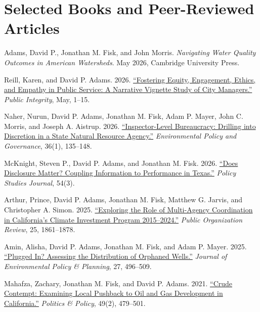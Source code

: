 \documentclass[12pt,letterpaper]{article}
\renewenvironment{itemize}{
  \begin{list}{}{
    \setlength{\leftmargin}{1.5em}
    \setlength{\itemsep}{0pt}\setlength{\topsep}{0pt}
    \setlength{\parskip}{0pt}
    \setlength{\parsep}{0.08em}
  }
}{
  \end{list}
}
\begin{document}
\section*{Selected Books and Peer-Reviewed Articles}
\begin{itemize}\leftmargin=2pt\itemindent=-15pt
  \item Adams, David P., Jonathan M. Fisk, and John Morris. \emph{Navigating Water Quality Outcomes in American Watersheds}. May 2026, Cambridge University Press.
  \item Reill, Karen, and David P. Adams. 2026. \href{https://doi.org/10.1080/10999922.2026.2665006}{``Fostering Equity, Engagement, Ethics, and Empathy in Public Service: A Narrative Vignette Study of City Managers.''} \emph{Public Integrity}, May, 1--15.
  \item Naher, Nurun, David P. Adams, Jonathan M. Fisk, Adam P. Mayer, John C. Morris, and Joseph A. Aistrup. 2026. \href{https://doi.org/10.1002/eet.70038}{``Inspector-Level Bureaucracy: Drilling into Discretion in a State Natural Resource Agency.''} \emph{Environmental Policy and Governance}, 36(1), 135--148.
  \item McKnight, Steven P., David P. Adams, and Jonathan M. Fisk. 2026. \href{https://doi.org/10.1111/psj.70064}{``Does Disclosure Matter? Coupling Information to Performance in Texas.''} \emph{Policy Studies Journal}, 54(3).
  \item Arthur, Prince, David P. Adams, Jonathan M. Fisk, Matthew G. Jarvis, and Christopher A. Simon. 2025. \href{https://doi.org/10.1007/s11115-025-00958-2}{``Exploring the Role of Multi-Agency Coordination in California's Climate Investment Program 2015--2024.''} \emph{Public Organization Review}, 25, 1861--1878.
  \item Amin, Alisha, David P. Adams, Jonathan M. Fisk, and Adam P. Mayer. 2025. \href{https://doi.org/10.1080/1523908X.2025.2480289}{``Plugged In? Assessing the Distribution of Orphaned Wells.''} \emph{Journal of Environmental Policy \& Planning}, 27, 496--509.
  \item Mahafza, Zachary, Jonathan M. Fisk, and David P. Adams. 2021. \href{https://doi.org/10.1111/polp.12401}{``Crude Contempt: Examining Local Pushback to Oil and Gas Development in California.''} \emph{Politics \& Policy}, 49(2), 479--501.
\end{itemize}
\end{document}
